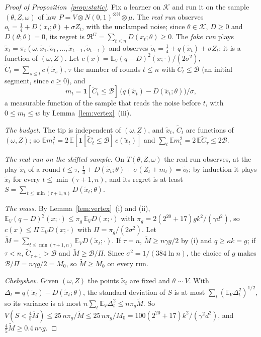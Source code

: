 \documentclass[11pt]{amsart}
\theoremstyle{definition}
\numberwithin{equation}{section}
\newcommand{\E}{\mathbb{E}}
\newcommand{\cK}{\mathcal{K}}
\newcommand{\Reg}{\mathfrak{R}}
\begin{document}
\begin{proof}[Proof of Proposition~\ref{prop:static}]
Fix a learner on $\cK$ and run it on the sample $(\theta,Z,\omega)$ of law $P=V\otimes N(0,1)^{\otimes\mathbb N}\otimes\mu$. The \emph{real run} observes $o_t=\frac14+D(x_t;\theta)+\sigma Z_t$, with the unclamped noise; since $\theta\in\cK$, $D\ge0$ and $D(\theta;\theta)=0$, its regret is $\Reg^G=\sum_{t\le n}D(x_t;\theta)\ge0$. The \emph{fake run} plays $\tilde x_t=\pi_t(\omega,\tilde x_1,\tilde o_1,\dots,\tilde x_{t-1},\tilde o_{t-1})$ and observes $\tilde o_t=\frac14+q(\tilde x_t)+\sigma Z_t$; it is a function of $(\omega,Z)$. Let $c(x)=\E_V(q-D)^2(x;\cdot)/(2\sigma^2)$, $\tilde C_t=\sum_{s\le t}c(\tilde x_s)$, $\tau$ the number of rounds $t\le n$ with $\tilde C_t\le\mathcal B$ (an initial segment, since $c\ge0$), and
\[
m_t=\mathbf 1[\tilde C_t\le\mathcal B]\,\bigl(q(\tilde x_t)-D(\tilde x_t;\theta)\bigr)/\sigma ,
\]
a measurable function of the sample that reads the noise before $t$, with $0\le m_t\le w$ by Lemma~\ref{lem:vertex}~(iii).

\emph{The budget.} The tip is independent of $(\omega,Z)$, and $\tilde x_t$, $\tilde C_t$ are functions of $(\omega,Z)$; so $\E m_t^2=2\,\E[\mathbf 1[\tilde C_t\le\mathcal B]\,c(\tilde x_t)]$ and $\sum_t\E m_t^2=2\,\E\tilde C_\tau\le2\mathcal B$.

\emph{The real run on the shifted sample.} On $T(\theta,Z,\omega)$ the real run observes, at the play $\tilde x_t$ of a round $t\le\tau$, $\frac14+D(\tilde x_t;\theta)+\sigma(Z_t+m_t)=\tilde o_t$; by induction it plays $\tilde x_t$ for every $t\le\min(\tau+1,n)$, and its regret is at least $S=\sum_{t\le\min(\tau+1,n)}D(\tilde x_t;\theta)$.

\emph{The mass.} By Lemma~\ref{lem:vertex}~(i) and (ii), $\E_V(q-D)^2(x;\cdot)\le\pi_g\,\E_VD(x;\cdot)$ with $\pi_g=2(2^{20}+17)gk^2/(\gamma d^2)$, so $c(x)\le\Pi\,\E_VD(x;\cdot)$ with $\Pi=\pi_g/(2\sigma^2)$. Let $\tilde M=\sum_{t\le\min(\tau+1,n)}\E_VD(\tilde x_t;\cdot)$. If $\tau=n$, $\tilde M\ge n\gamma g/2$ by (i) and $q\ge\kappa k=g$; if $\tau<n$, $\tilde C_{\tau+1}>\mathcal B$ and $\tilde M\ge\mathcal B/\Pi$. Since $\sigma^2=1/(384\ln n)$, the choice of $g$ makes $\mathcal B/\Pi=n\gamma g/2=M_0$, so $\tilde M\ge M_0$ on every run.

\emph{Chebyshev.} Given $(\omega,Z)$ the points $\tilde x_t$ are fixed and $\theta\sim V$. With $\Delta_t=q(\tilde x_t)-D(\tilde x_t;\theta)$, the standard deviation of $S$ is at most $\sum_t(\E_V\Delta_t^2)^{1/2}$, so its variance is at most $n\sum_t\E_V\Delta_t^2\le n\pi_g\tilde M$. So $V(S<\frac45\tilde M)\le25\,n\pi_g/\tilde M\le25\,n\pi_g/M_0=100(2^{20}+17)k^2/(\gamma^2d^2)$, and $\frac45\tilde M\ge0.4\,n\gamma g$.


\end{proof}
\end{document}
